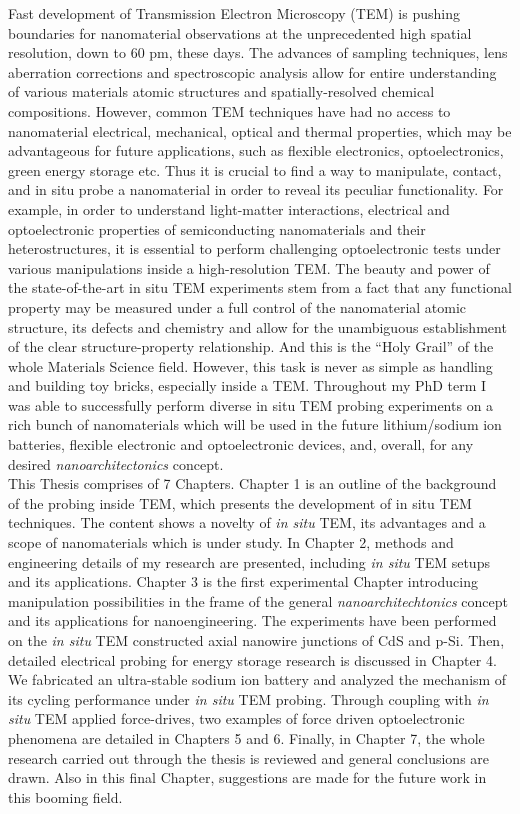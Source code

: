 \justify

Fast development of Transmission Electron Microscopy (TEM) is pushing boundaries for nanomaterial observations at the unprecedented high spatial resolution, down to 60 pm, these days. The advances of sampling techniques, lens aberration corrections and spectroscopic analysis allow for entire understanding of various materials atomic structures and spatially-resolved chemical compositions. However, common TEM techniques have had no access to nanomaterial electrical, mechanical, optical and thermal properties, which may be advantageous for future applications, such as flexible electronics, optoelectronics, green energy storage etc. Thus it is crucial to find a way to manipulate, contact, and in situ probe a nanomaterial in order to reveal its peculiar functionality. For example, in order to understand light-matter interactions, electrical and optoelectronic properties of semiconducting nanomaterials and their heterostructures, it is essential to perform challenging optoelectronic tests under various manipulations inside a high-resolution TEM. The beauty and power of the state-of-the-art in situ TEM experiments stem from a fact that any functional property may be measured under a full control of the nanomaterial atomic structure, its defects and chemistry and allow for the unambiguous establishment of the clear structure-property relationship. And this is the “Holy Grail” of the whole Materials Science field. However, this task is never as simple as handling and building toy bricks, especially inside a TEM. Throughout my PhD term I was able to successfully perform diverse in situ TEM probing experiments on a rich bunch of nanomaterials which will be used in the future lithium/sodium ion batteries, flexible electronic and optoelectronic devices, and, overall, for any desired \textit{nanoarchitectonics} concept. \\
This Thesis comprises of 7 Chapters. Chapter 1 is an outline of the background of the probing inside TEM, which presents the development of in situ TEM techniques. The content shows a novelty of {\em in situ} TEM, its advantages and a scope of nanomaterials which is under study. In Chapter 2, methods and engineering details of my research are presented, including {\em in situ} TEM setups and its applications. Chapter 3 is the first experimental Chapter introducing manipulation possibilities in the frame of the general {\em nanoarchitechtonics} concept and its applications for nanoengineering. The experiments have been performed on the {\em in situ} TEM constructed axial nanowire junctions of CdS and p-Si. Then, detailed electrical probing for energy storage research is discussed in Chapter 4. We fabricated an ultra-stable sodium ion battery and analyzed the mechanism of its cycling performance under {\em in situ} TEM probing. Through coupling with {\em in situ} TEM applied force-drives, two examples of force driven optoelectronic phenomena are detailed in Chapters 5 and 6. Finally, in Chapter 7, the whole research carried out through the thesis is reviewed and general conclusions are drawn. Also in this final Chapter, suggestions are made for the future work in this booming field. 
